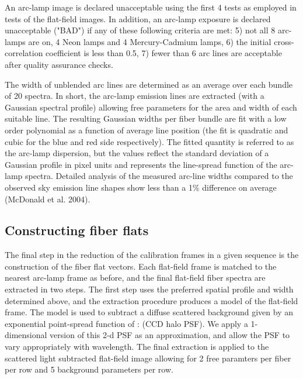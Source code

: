 \documentclass[12pt,preprint]{aastex}
\begin{document}
An arc-lamp image is declared unacceptable using the first 4 tests as employed
in tests of the flat-field images.  In addition, an arc-lamp exposure
is declared unacceptable ("BAD") if any of these following criteria are met:
5) not all 8 arc-lamps are on, 4 Neon lamps and 4 Mercury-Cadmium lamps,
6) the initial cross-correlation coefficient is less than 0.5,
7) fewer than 6 arc lines are acceptable after quality assurance checks.

The width of unblended arc lines are determined as an average over
each bundle of 20 spectra.  In short, the arc-lamp emission lines 
are extracted (with a Gaussian spectral profile) 
allowing free parameters for the area and width of each suitable line.
The resulting Gaussian widths per fiber bundle are fit 
with a low order polynomial as a function of average line position
(the fit is quadratic and cubic for the blue and red side respectively).
The fitted quantity is referred to as the arc-lamp dispersion,
but the values reflect the standard deviation of a Gaussian 
profile in pixel units and represents the line-spread function of the 
arc-lamp spectra.  Detailed analysis of the measured arc-line widths
compared to the observed sky emission line shapes show less than a 1\%
difference on average (McDonald et al. 2004). 


\subsection{Constructing fiber flats}

The final step in the reduction of the calibration frames in a given
sequence is the construction of the fiber flat vectors.  Each flat-field
frame is matched to the nearest arc-lamp frame as before, and the
final flat-field fiber spectra are extracted in two steps.  The first
step uses the preferred spatial profile and width determined above,
and the extraction procedure produces a model of the flat-field frame.
The model is used to subtract a diffuse scattered background given
by an exponential point-spread function of :  (CCD halo PSF).
We apply a 1-dimensional version of this 2-d PSF as an approximation,
and allow the PSF to vary appropriately with wavelength.
The final extraction is applied to the scattered light subtracted flat-field
image allowing for 2 free paramters per fiber per row and 
5 background parameters per row.
\end{document}
